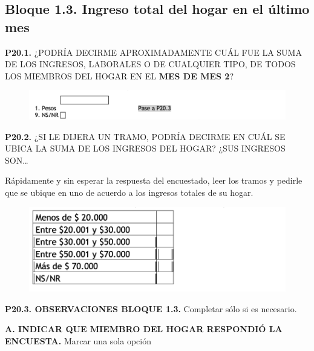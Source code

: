 \documentclass[
  openany]{book}
\begin{document}
\hypertarget{bloque-1.3.-ingreso-total-del-hogar-en-el-uxfaltimo-mes}{%
\subsection{Bloque 1.3. Ingreso total del hogar en el último mes}\label{bloque-1.3.-ingreso-total-del-hogar-en-el-uxfaltimo-mes}}

\textbf{P20.1.} ¿PODRÍA DECIRME APROXIMADAMENTE CUÁL FUE LA SUMA DE LOS INGRESOS, LABORALES O DE CUALQUIER TIPO, DE TODOS LOS MIEMBROS DEL HOGAR EN EL \textbf{MES DE MES 2}?

\begin{figure}

{\centering \includegraphics[width=1\linewidth]{imagenes/figura6-301} 

}

\end{figure}

\textbf{P20.2.} ¿SI LE DIJERA UN TRAMO, PODRÍA DECIRME EN CUÁL SE UBICA LA SUMA DE LOS INGRESOS DEL HOGAR? ¿SUS INGRESOS SON\ldots{}

Rápidamente y sin esperar la respuesta del encuestado, leer los tramos y pedirle que se ubique en uno de acuerdo a los ingresos totales de su hogar.

\begin{figure}

{\centering \includegraphics[width=1\linewidth]{imagenes/figura6-302} 

}

\end{figure}

\textbf{P20.3. OBSERVACIONES BLOQUE 1.3.} Completar sólo si es necesario.

\textbf{A. INDICAR QUE MIEMBRO DEL HOGAR RESPONDIÓ LA ENCUESTA.}
Marcar una sola opción
\end{document}
